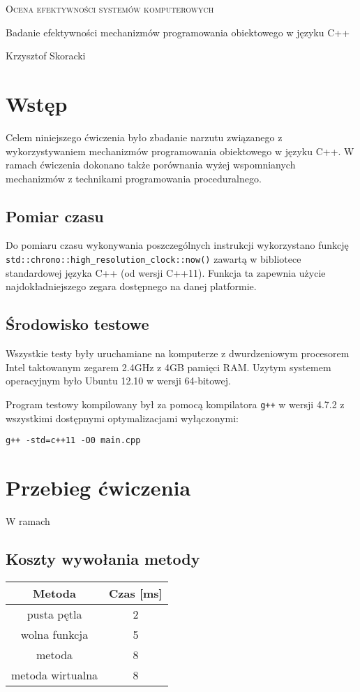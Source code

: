 \documentclass{article}
\begin{document}
\begin{center}
\textsc{\huge Ocena efektywności systemów komputerowych}


\vspace{0.8cm}
{\Large Badanie efektywności mechanizmów programowania obiektowego w języku C++}
\vspace{0.8cm}

Krzysztof Skoracki
\vspace{1cm}
\end{center}
\section{Wstęp}
Celem niniejszego ćwiczenia było zbadanie narzutu związanego z wykorzystywaniem mechanizmów programowania obiektowego w języku C++. W ramach ćwiczenia dokonano także porównania wyżej wspomnianych mechanizmów z technikami programowania proceduralnego.

\subsection{Pomiar czasu}
Do pomiaru czasu wykonywania poszczególnych instrukcji wykorzystano funkcję \texttt{std::chrono::high\_resolution\_clock::now()} zawartą w bibliotece standardowej języka C++ (od wersji C++11). Funkcja ta zapewnia użycie najdokładniejszego zegara dostępnego na danej platformie.

\subsection{Środowisko testowe}
Wszystkie testy były uruchamiane na komputerze z dwurdzeniowym procesorem Intel taktowanym zegarem 2.4GHz z 4GB pamięci RAM. Uzytym systemem operacyjnym było Ubuntu 12.10 w wersji 64-bitowej.

Program testowy kompilowany był za pomocą kompilatora \texttt{g++} w wersji 4.7.2 z wszystkimi dostępnymi optymalizacjami wyłączonymi:

\texttt{g++ -std=c++11 -O0 main.cpp}

\section{Przebieg ćwiczenia}
W ramach
\subsection{Koszty wywołania metody}
\begin{tabular}{ c c }
  \textbf{Metoda} & \textbf{Czas [ms]} \\ \hline
  pusta pętla & 2 \\ \hline
  wolna funkcja & 5 \\ \hline
  metoda & 8 \\ \hline
  metoda wirtualna & 8 \\
\end{tabular}
\end{document}
